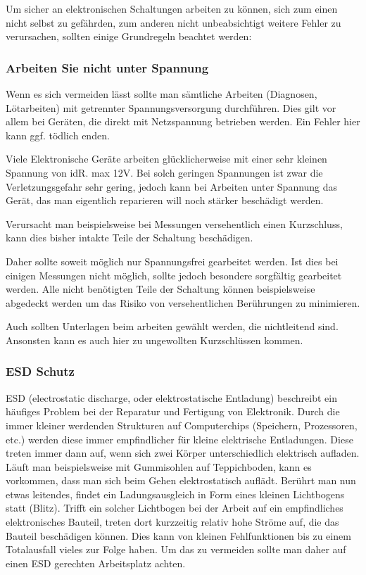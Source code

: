 Um sicher an elektronischen Schaltungen arbeiten zu können, sich zum einen nicht selbst zu gefährden, zum anderen nicht unbeabsichtigt weitere Fehler zu verursachen, sollten einige Grundregeln beachtet werden:

\subsubsection{Arbeiten Sie nicht unter Spannung}

Wenn es sich vermeiden lässt sollte man sämtliche Arbeiten (Diagnosen, Lötarbeiten) mit getrennter Spannungsversorgung durchführen.
Dies gilt vor allem bei Geräten, die direkt mit Netzspannung betrieben werden.
Ein Fehler hier kann ggf. tödlich enden.

Viele Elektronische Geräte arbeiten glücklicherweise mit einer sehr kleinen Spannung von idR. max 12V. Bei solch geringen Spannungen ist zwar die Verletzungsgefahr sehr gering, jedoch kann bei Arbeiten unter Spannung das Gerät, das man eigentlich reparieren will noch stärker beschädigt werden.

Verursacht man beispielsweise bei Messungen versehentlich einen Kurzschluss, kann dies bisher intakte Teile der Schaltung beschädigen.

Daher sollte soweit möglich nur Spannungsfrei gearbeitet werden.
Ist dies bei einigen Messungen nicht möglich, sollte jedoch besondere sorgfältig gearbeitet werden. Alle nicht benötigten Teile der Schaltung können beispielsweise abgedeckt werden um das Risiko von versehentlichen Berührungen zu minimieren.

Auch sollten Unterlagen beim arbeiten gewählt werden, die nichtleitend sind.
Ansonsten kann es auch hier zu ungewollten Kurzschlüssen kommen.

\subsubsection{ESD Schutz}

ESD (electrostatic discharge, oder elektrostatische Entladung) beschreibt ein häufiges Problem bei der Reparatur und Fertigung von Elektronik. Durch die immer kleiner werdenden Strukturen auf Computerchips (Speichern, Prozessoren, etc.) werden diese immer empfindlicher für kleine elektrische Entladungen. Diese treten immer dann auf, wenn sich zwei Körper unterschiedlich elektrisch aufladen. Läuft man beispielsweise mit Gummisohlen auf Teppichboden, kann es vorkommen, dass man sich beim Gehen elektrostatisch auflädt. Berührt man nun etwas leitendes, findet ein Ladungsausgleich in Form eines kleinen Lichtbogens statt (Blitz).
Trifft ein solcher Lichtbogen bei der Arbeit auf ein empfindliches elektronisches Bauteil, treten dort kurzzeitig relativ hohe Ströme auf, die das Bauteil beschädigen können.
Dies kann von kleinen Fehlfunktionen bis zu einem Totalausfall vieles zur Folge haben.
Um das zu vermeiden sollte man daher auf einen ESD gerechten Arbeitsplatz achten.

